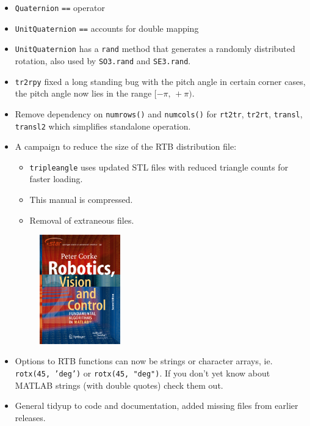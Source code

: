 \documentclass[a4paper,twoside]{report}
\begin{document}
\begin{itemize}
\item \texttt{Quaternion} \texttt{==} operator
\item  \texttt{UnitQuaternion}  \texttt{==}  accounts for double mapping
\item \texttt{UnitQuaternion} has a \texttt{rand} method that generates a randomly distributed rotation,  also used by \texttt{SO3.rand} and  \texttt{SE3.rand}.
\item \texttt{tr2rpy} fixed a long standing bug with the pitch angle in certain corner cases, the pitch angle now lies in the range $[-\pi, \,+\pi)$.

\item Remove dependency on \texttt{numrows()} and \texttt{numcols()} for \texttt{rt2tr}, \texttt{tr2rt}, \texttt{transl}, \texttt{transl2} which simplifies standalone operation.

\item A campaign to reduce the size of the RTB distribution file:
\begin{itemize}
	\item \texttt{tripleangle} uses updated STL files with reduced triangle counts for faster loading.
	\item This manual is compressed.
	\item Removal of extraneous files.
\end{itemize}
\begin{figure}
\vspace{-2ex}\includegraphics[width=3.5cm]{figs/frontcover.pdf}
\end{figure}

\item Options to RTB functions can now be strings or character arrays, ie. \texttt{rotx(45, 'deg')} or \texttt{rotx(45, "deg")}.  If you don't yet know about MATLAB strings (with double quotes) check them out.
\item General tidyup to code and documentation, added missing files from earlier releases.
\end{itemize}
\end{document}
